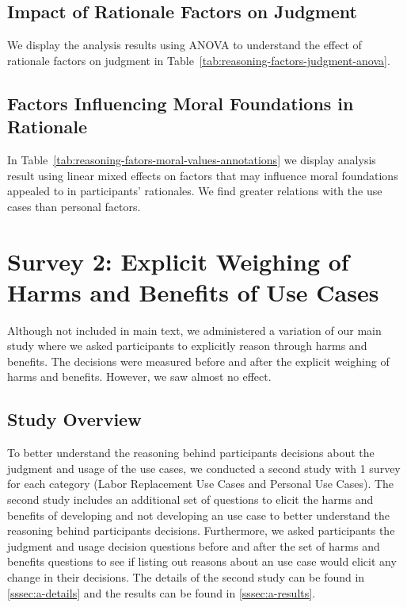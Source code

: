 \subsection{Impact of Rationale Factors on Judgment}
We display the analysis results using ANOVA to understand the effect of rationale factors on judgment in Table~\ref{tab:reasoning-factors-judgment-anova}.


\subsection{Factors Influencing Moral Foundations in  Rationale}
In Table~\ref{tab:reasoning-fators-moral-values-annotations} we display analysis result using linear mixed effects on factors that may influence moral foundations appealed to in participants' rationales. We find greater relations with the use cases than personal factors. 


\section{Survey 2: Explicit Weighing of Harms and Benefits of Use Cases}
Although not included in main text, we administered a variation of our main study where we asked participants to explicitly reason through harms and benefits. The decisions were measured before and after the explicit weighing of harms and benefits. However, we saw almost no effect. 

\subsection{Study Overview}
To better understand the reasoning behind participants decisions about the judgment and usage of the use cases, we conducted a second study with 1 survey for each category (Labor Replacement Use Cases and Personal Use Cases). The second study includes an additional set of questions to elicit the harms and benefits of developing and not developing an use case to better understand the reasoning behind participants decisions. Furthermore, we asked participants the judgment and usage decision questions before and after the set of harms and benefits questions to see if listing out reasons about an use case would elicit any change in their decisions. The details of the second study can be found in \ref{sssec:a-details} and the results can be found in \ref{sssec:a-results}.


